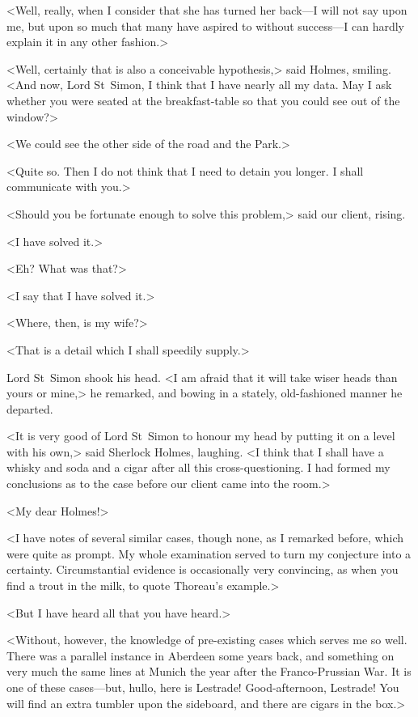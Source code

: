 <Well, really, when I consider that she has turned her back—I will not say upon me, but upon so much that many have aspired to without success—I can hardly explain it in any other fashion.>

<Well, certainly that is also a conceivable hypothesis,> said Holmes, smiling. <And now, Lord St~Simon, I think that I have nearly all my data. May I ask whether you were seated at the breakfast-table so that you could see out of the window?>

<We could see the other side of the road and the Park.>

<Quite so. Then I do not think that I need to detain you longer. I shall communicate with you.>

<Should you be fortunate enough to solve this problem,> said our client, rising.

<I have solved it.>

<Eh? What was that?>

<I say that I have solved it.>

<Where, then, is my wife?>

<That is a detail which I shall speedily supply.>

Lord St~Simon shook his head. <I am afraid that it will take wiser heads than yours or mine,> he remarked, and bowing in a stately, old-fashioned manner he departed.

<It is very good of Lord St~Simon to honour my head by putting it on a level with his own,> said Sherlock Holmes, laughing. <I think that I shall have a whisky and soda and a cigar after all this cross-questioning. I had formed my conclusions as to the case before our client came into the room.>

<My dear Holmes!>

<I have notes of several similar cases, though none, as I remarked before, which were quite as prompt. My whole examination served to turn my conjecture into a certainty. Circumstantial evidence is occasionally very convincing, as when you find a trout in the milk, to quote Thoreau's example.>

<But I have heard all that you have heard.>

<Without, however, the knowledge of pre-existing cases which serves me so well. There was a parallel instance in Aberdeen some years back, and something on very much the same lines at Munich the year after the Franco-Prussian War. It is one of these cases—but, hullo, here is Lestrade! Good-afternoon, Lestrade! You will find an extra tumbler upon the sideboard, and there are cigars in the box.>

